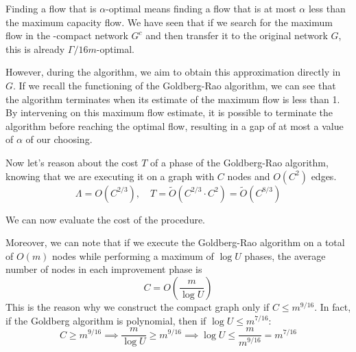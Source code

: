 Finding a flow that is \(\alpha\)-optimal means finding a flow that is at most \(\alpha\) less than the maximum capacity flow. We have seen that if we search for the maximum flow in the \gmm-compact network \( G^c \) and then transfer it to the original network \( G \), this is already \(\Gamma/16m\)-optimal.

However, during the algorithm, we aim to obtain this approximation directly in \( G \). If we recall the functioning of the Goldberg-Rao algorithm, we can see that the algorithm terminates when its estimate of the maximum flow is less than 1. By intervening on this maximum flow estimate, it is possible to terminate the algorithm before reaching the optimal flow, resulting in a gap of at most a value of \(\alpha\) of our choosing.

Now let’s reason about the cost \( T \) of a phase of the Goldberg-Rao algorithm, knowing that we are executing it on a graph with \( C \) nodes and \( O(C^2) \) edges.
\[ \Lambda = O(C^{2/3}), \quad T = \tilde{O}(C^{2/3} \cdot C^2) = \tilde{O}(C^{8/3}) \]

We can now evaluate the cost of the  procedure.

Moreover, we can note that if we execute the Goldberg-Rao algorithm on a total of \( O(m) \) nodes while performing a maximum of \( \log U \) phases, the average number of nodes in each improvement phase is
\[ C = O\left( \frac{m}{\log{U}} \right) \]
This is the reason why we construct the compact graph only if \( C \le m^{9/16} \). In fact, if the Goldberg algorithm is polynomial, then if \( \log U \le m^{7/16} \):
\[ C \ge m^{9/16} \implies \frac{m}{\log U} \ge m^{9/16} \implies \log U \le \frac{m}{m^{9/16}} = m^{7/16} \]


